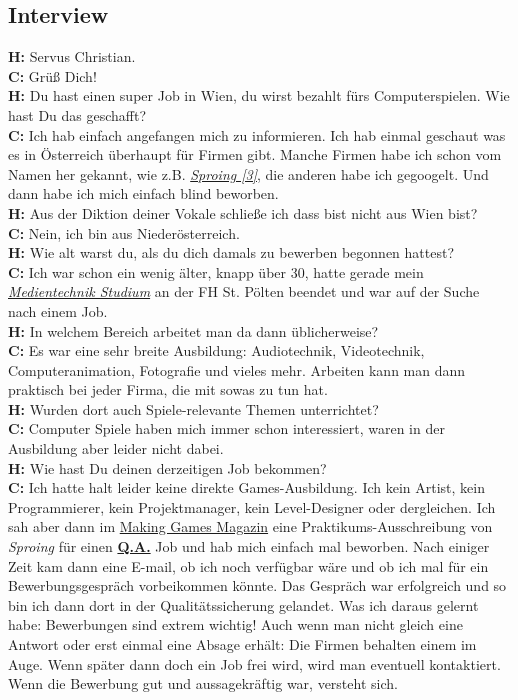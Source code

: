 \documentclass[10pt,a4paper,ngerman,twoside]{article} %
\begin{document}
\begin{multicols}{3}
\subsection*{Interview}
\textbf{H:} Servus Christian. \\
\textbf{C:} Grüß Dich! \\
\textbf{H:} Du hast einen super Job in Wien, du wirst bezahlt fürs Computerspielen. Wie hast Du das geschafft? \\
\textbf{C:} Ich hab einfach angefangen mich zu informieren. Ich hab einmal geschaut was es in Österreich überhaupt für Firmen gibt. Manche Firmen habe ich schon vom Namen her gekannt, wie z.B. \href{https://www.sproing.at/}{\textit{Sproing [3]}}, die anderen habe ich gegoogelt. Und dann habe ich mich einfach blind beworben. \\
\textbf{H:} Aus der Diktion deiner Vokale schließe ich dass bist nicht aus Wien bist? \\
\textbf{C:} Nein, ich bin aus Niederösterreich. \\
\textbf{H:} Wie alt warst du, als du dich damals zu bewerben begonnen hattest? \\
\textbf{C:} Ich war schon ein wenig älter, knapp über 30, hatte gerade mein \href{http://www.fhstp.ac.at/studienangebot/bachelor/mt}{\textit{Medientechnik Studium}} an der FH St. Pölten beendet und war auf der Suche nach einem Job. \\
\textbf{H:} In welchem Bereich arbeitet man da dann üblicherweise? \\
\textbf{C:} Es war eine sehr breite Ausbildung: Audiotechnik, Videotechnik, Computeranimation, Fotografie und vieles mehr. Arbeiten kann man dann praktisch bei jeder Firma, die mit sowas zu tun hat. \\
\textbf{H:} Wurden dort auch Spiele-relevante Themen unterrichtet? \\
\textbf{C:} Computer Spiele haben mich immer schon interessiert, waren in der 
Ausbildung aber leider nicht dabei. \\
\textbf{H:} Wie hast Du deinen derzeitigen Job bekommen? \\
\textbf{C:} Ich hatte halt leider keine direkte Games-Ausbildung. Ich kein Artist, kein Programmierer, kein Projektmanager, kein Level-Designer oder dergleichen. Ich sah aber dann im \href{http://www.makinggames.de/}{Making Games Magazin} eine Praktikums-Ausschreibung von \textit{Sproing} für einen \href{https://de.wikipedia.org/wiki/Quality_Assurance}{\textbf{Q.A.}} Job und hab mich einfach mal beworben. Nach einiger Zeit kam dann eine E-mail, ob ich noch verfügbar wäre und ob ich mal für ein Bewerbungsgespräch vorbeikommen könnte. Das Gespräch war erfolgreich und so bin ich dann dort in der Qualitätssicherung gelandet. Was ich daraus gelernt habe:  Bewerbungen sind extrem wichtig! Auch wenn man nicht gleich eine Antwort oder erst einmal eine Absage erhält: Die Firmen behalten einem im Auge. Wenn später dann doch ein Job frei wird, wird man eventuell kontaktiert. Wenn die Bewerbung gut und aussagekräftig war, versteht sich. \\

\end{multicols}
\end{document}
